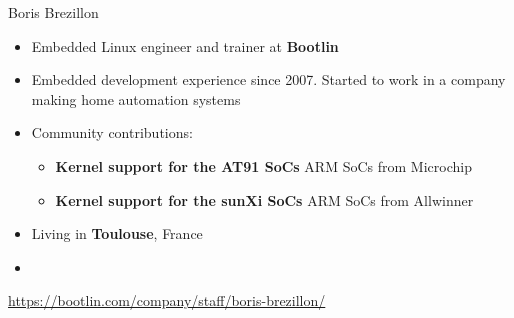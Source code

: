 \begin{frame}{Boris Brezillon}
    \begin{itemize}
	\item Embedded Linux engineer and trainer at {\bf Bootlin}
	\item Embedded development experience since 2007. Started
	      to work in a company making home automation systems
        \item Community contributions:
	\begin{itemize}
		\item {\bf Kernel support for the AT91 SoCs} ARM SoCs from Microchip
		\item {\bf Kernel support for the sunXi SoCs} ARM SoCs from Allwinner
	\end{itemize}
	\item Living in {\bf Toulouse}, France
	\item {}
    \end{itemize}
    {\small \url{https://bootlin.com/company/staff/boris-brezillon/}}
\end{frame}
